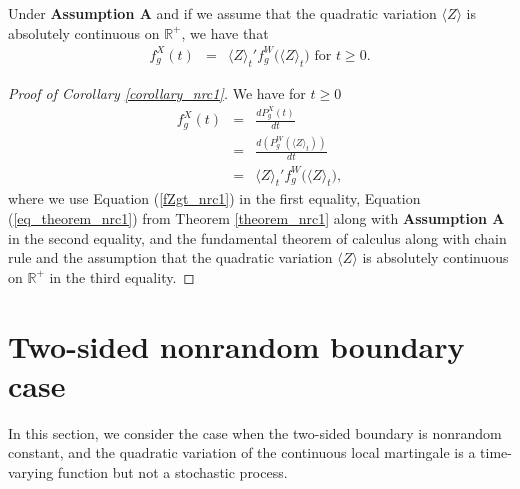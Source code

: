 \documentclass[aop]{imsart}
\theoremstyle{plain}
\theoremstyle{remark}
\newcommand{\reels}{\mathbb{R}}
\begin{document}
\begin{corollary}
\label{corollary_nrc1}
Under \textbf{Assumption A} and if we assume that the quadratic variation $\langle Z\rangle$ is absolutely continuous on $\reels^+$, we have that
\begin{eqnarray}
\label{eq_corollary_nrc1}
f_g^X (t) & = & \langle Z\rangle_t ' f_g^W \big(\langle Z\rangle_t\big) \text{ for } t \geq 0.
\end{eqnarray}
\end{corollary}
\begin{proof}[Proof of Corollary \ref{corollary_nrc1}]
We have for $t \geq 0$
\begin{eqnarray*}
f_g^X (t) & = & \frac{dP_g^X(t)}{dt}\\
& = & \frac{d(P_g^W(\langle Z\rangle_t))}{dt}\\
& = & \langle Z\rangle_t ' f_g^W \big(\langle Z\rangle_t\big),
\end{eqnarray*}
where we use Equation (\ref{fZgt_nrc1}) in the first equality, Equation (\ref{eq_theorem_nrc1}) from Theorem \ref{theorem_nrc1} along with \textbf{Assumption A} in the second equality, and the fundamental theorem of calculus along with chain rule and the assumption that the quadratic variation $\langle Z\rangle$ is absolutely continuous on $\reels^+$ in the third equality.
\end{proof}

\section{Two-sided nonrandom boundary case}
In this section, we consider the case when the two-sided boundary is nonrandom constant, and the quadratic variation of the continuous local martingale is a time-varying function but not a stochastic process. 
\end{document}
